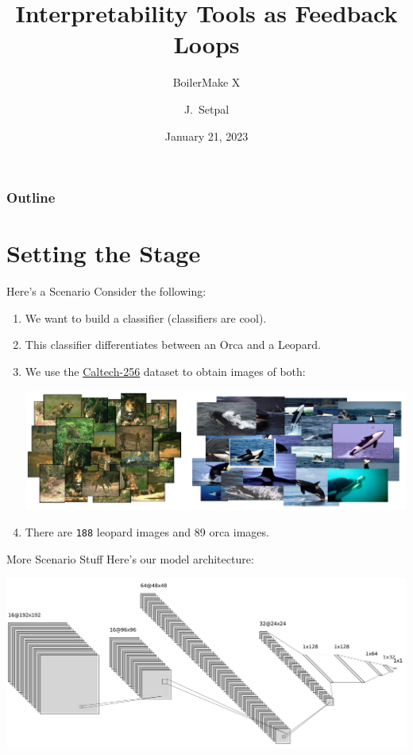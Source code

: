 \documentclass{beamer}
\title[Leveraging Machine Interpretability]{Interpretability Tools as Feedback Loops}
\subtitle{BoilerMake X}
\author{J.~Setpal}
\date{January 21, 2023}
\begin{document}
\frame{\titlepage}


\begin{frame}
\frametitle{Outline}
\tableofcontents
\end{frame}

\section{Setting the Stage}
\begin{frame}[fragile]{Here's a Scenario}
	Consider the following:
	\begin{enumerate}[label=\alph*.]
		\item We want to build a classifier (classifiers are cool). \pause
		\item This classifier differentiates between an Orca and a Leopard. \pause
		\item We use the \href{https://data.caltech.edu/records/nyy15-4j048}{Caltech-256} dataset to obtain images of both:
			\begin{center}
				\hspace*{-2em}  
				\includegraphics[width=\textwidth]{img/dataset.pdf}
			\end{center} \pause 
		\item There are \texttt{188} leopard images and 89 orca images.
	\end{enumerate} 
\end{frame}

\begin{frame}{More Scenario Stuff}
	Here's our model architecture:
	\begin{center}
		\includegraphics[width=\textwidth]{img/nn}
	\end{center}
\end{frame}
\end{document}
